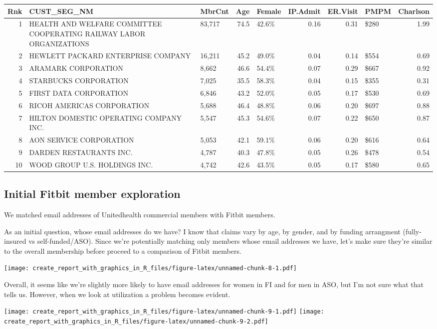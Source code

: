 \documentclass[]{article}
\begin{document}
\begin{longtable}[]{@{}rllrlrrlr@{}}
\toprule
Rnk & CUST\_SEG\_NM & MbrCnt & Age & Female & IP.Admit & ER.Visit & PMPM
& Charlson\tabularnewline
\midrule
\endhead
1 & HEALTH AND WELFARE COMMITTEE COOPERATING RAILWAY LABOR ORGANIZATIONS
& 83,717 & 74.5 & 42.6\% & 0.16 & 0.31 & \$280 & 1.99\tabularnewline
2 & HEWLETT PACKARD ENTERPRISE COMPANY & 16,211 & 45.2 & 49.0\% & 0.04 &
0.14 & \$554 & 0.69\tabularnewline
3 & ARAMARK CORPORATION & 8,662 & 46.6 & 54.4\% & 0.07 & 0.29 & \$667 &
0.92\tabularnewline
4 & STARBUCKS CORPORATION & 7,025 & 35.5 & 58.3\% & 0.04 & 0.15 & \$355
& 0.31\tabularnewline
5 & FIRST DATA CORPORATION & 6,846 & 43.2 & 52.0\% & 0.05 & 0.17 & \$530
& 0.69\tabularnewline
6 & RICOH AMERICAS CORPORATION & 5,688 & 46.4 & 48.8\% & 0.06 & 0.20 &
\$697 & 0.88\tabularnewline
7 & HILTON DOMESTIC OPERATING COMPANY INC. & 5,547 & 45.3 & 54.6\% &
0.07 & 0.22 & \$650 & 0.87\tabularnewline
8 & AON SERVICE CORPORATION & 5,053 & 42.1 & 59.1\% & 0.06 & 0.20 &
\$616 & 0.64\tabularnewline
9 & DARDEN RESTAURANTS INC. & 4,787 & 40.3 & 47.8\% & 0.05 & 0.26 &
\$478 & 0.54\tabularnewline
10 & WOOD GROUP U.S. HOLDINGS INC. & 4,742 & 42.6 & 43.5\% & 0.05 & 0.17
& \$580 & 0.65\tabularnewline
\bottomrule
\end{longtable}

\subsection{Initial Fitbit member
exploration}\label{initial-fitbit-member-exploration}

We matched email addresses of Unitedhealth commercial members with
Fitbit members.

As an initial question, whose email addresses do we have? I know that
claims vary by age, by gender, and by funding arrangment (fully-insured
vs self-funded/ASO). Since we're potentially matching only members whose
email addresses we have, let's make sure they're similar to the overall
membership before proceed to a comparison of Fitbit members.

\texttt{[image: create\_report\_with\_graphics\_in\_R\_files/figure-latex/unnamed-chunk-8-1.pdf]}

Overall, it seems like we're slightly more likely to have email
addresses for women in FI and for men in ASO, but I'm not sure what that
tells us. However, when we look at utilization a problem becomes
evident.

\texttt{[image: create\_report\_with\_graphics\_in\_R\_files/figure-latex/unnamed-chunk-9-1.pdf]}
\texttt{[image: create\_report\_with\_graphics\_in\_R\_files/figure-latex/unnamed-chunk-9-2.pdf]}
\end{document}
